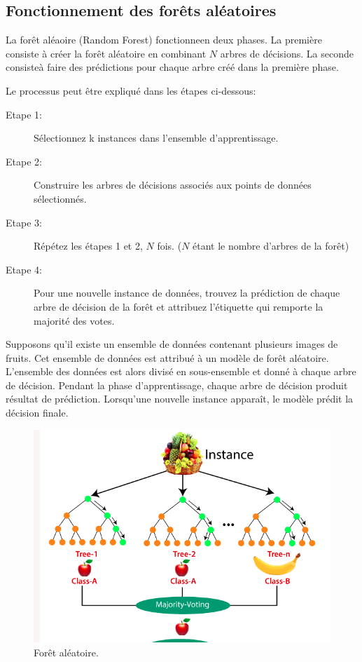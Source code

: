   \subsection{Fonctionnement des forêts aléatoires}

  La forêt aléaoire (Random Forest) fonctionneen deux phases. La première
  consiste à créer la forêt aléatoire en combinant $N$ arbres de décisions. La
  seconde consisteà faire des prédictions pour chaque arbre créé dans la
  première phase.

  Le processus peut être expliqué dans les étapes ci-dessous:
  \begin{description}
    \item[Etape 1:] Sélectionnez k instances dans l'ensemble
      d'apprentissage.
    \item[Etape 2:] Construire les arbres de décisions associés aux points de
      données sélectionnés.
    \item[Etape 3:] Répétez les étapes 1 et 2, $N$ fois. ($N$ étant le nombre d'arbres
      de la forêt)
    \item[Etape 4:]Pour une nouvelle instance de données, trouvez la
      prédiction de chaque arbre de décision de la forêt et attribuez
      l'étiquette qui remporte la majorité des votes.
  \end{description}

  Supposons qu'il existe un ensemble de données contenant plusieurs images de
  fruits. Cet ensemble de données est attribué à un modèle de forêt aléatoire.
  L'ensemble des données est alors divisé en sous-ensemble et donné à chaque
  arbre de décision. Pendant la phase d'apprentissage, chaque arbre de décision
  produit résultat de prédiction. Lorsqu'une nouvelle instance apparaît, le
  modèle prédit la décision finale.

  \begin{figure}[h!]
    \begin{center}
      \includegraphics[width=14cm]{images/foret.png}
      \caption{Forêt aléatoire.\label{fig:foretaleatoire}}
    \end{center}
  \end{figure}


